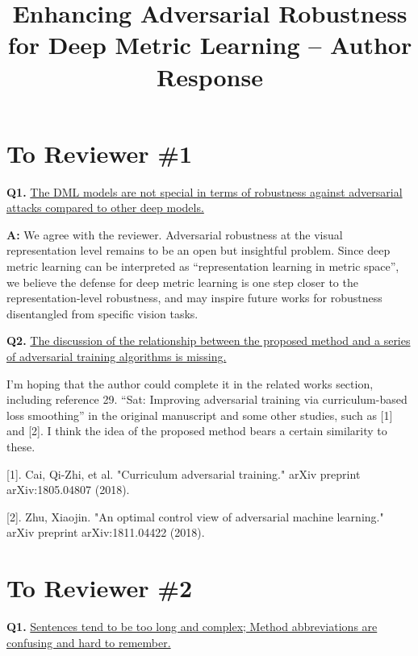 \documentclass[10pt,twocolumn,letterpaper]{article}
\begin{document}
\title{Enhancing Adversarial Robustness for Deep Metric Learning -- Author Response}  %

\maketitle
\thispagestyle{empty}
\appendix

\section*{To Reviewer \#1}

\noindent\textbf{Q1.}
%
\ul{
The DML models are not special in terms of robustness against
adversarial attacks compared to other deep models.
}

\textbf{A:} 
%
We agree with the reviewer. Adversarial robustness at the visual representation
level remains to be an open but insightful problem. Since deep metric learning
can be interpreted as ``representation learning in metric space'', we believe
the defense for deep metric learning is one step closer to the
representation-level robustness, and may inspire future works for 
robustness disentangled from specific vision tasks.

\noindent\textbf{Q2.}
%
\ul{
The discussion of the relationship between the proposed method and a series of
adversarial training algorithms is missing.
}

I’m hoping that the author could complete it in the related works section,
including reference 29. “Sat: Improving adversarial training via
curriculum-based loss smoothing” in the original manuscript and some other
studies, such as [1] and [2]. I think the idea of the proposed method bears a
certain similarity to these.

[1]. Cai, Qi-Zhi, et al. "Curriculum adversarial training." arXiv preprint arXiv:1805.04807 (2018).

[2]. Zhu, Xiaojin. "An optimal control view of adversarial machine learning." arXiv preprint arXiv:1811.04422 (2018).

\section*{To Reviewer \#2}

\noindent\textbf{Q1.}
%
\ul{
Sentences tend to be too long and complex; Method abbreviations are confusing
and hard to remember.
}
\end{document}

